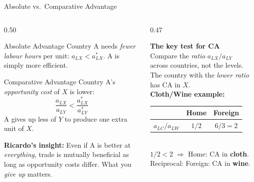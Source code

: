 \documentclass[aspectratio=169]{beamer}
\begin{document}
\begin{frame}[shrink=12]{Absolute vs.\ Comparative Advantage}
\begin{columns}[T]
\begin{column}{0.50\textwidth}
\begin{block}{Absolute Advantage}
\small Country A needs \emph{fewer labour hours} per unit:
$a_{LX} < a_{LX}^{*}$.  A is simply more efficient.
\end{block}
\vspace{0.3em}
\begin{block}{Comparative Advantage}
\small Country A's \emph{opportunity cost} of $X$ is lower:
\[\frac{a_{LX}}{a_{LY}} < \frac{a_{LX}^{*}}{a_{LY}^{*}}\]
A gives up less of $Y$ to produce one extra unit of $X$.
\end{block}
\vspace{0.3em}
\begin{varbox}
\footnotesize\textbf{Ricardo's insight:} Even if A is better
at \emph{everything}, trade is mutually beneficial as long as
opportunity costs differ.  What you \emph{give up} matters.
\end{varbox}
\end{column}
\begin{column}{0.47\textwidth}
\begin{varbox}
\small\textbf{The key test for CA}\\[0.2em]
Compare the \emph{ratio} $a_{LX}/a_{LY}$ across countries,
not the levels.  The country with the \emph{lower ratio}
has CA in $X$.\\[0.3em]
\textbf{Cloth/Wine example:}\\[0.1em]
\begin{tabular}{lcc}
& Home & Foreign\\\midrule
$a_{LC}/a_{LW}$ & $1/2$ & $6/3=2$
\end{tabular}\\[0.2em]
$1/2 < 2$ $\Rightarrow$ Home: CA in \textbf{cloth}.\\
Reciprocal: Foreign: CA in \textbf{wine}.
\end{varbox}
\vspace{0.3em}

\end{column}
\end{columns}
\end{frame}
\end{document}
